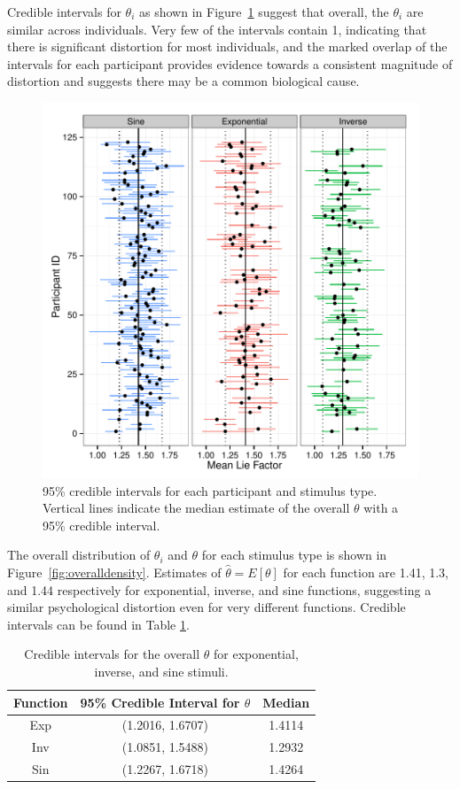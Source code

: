 \documentclass[journal]{vgtc}\usepackage{graphicx, color}
\begin{document}
Credible intervals for $\theta_i$ as shown in Figure~\ref{fig:indivCIs} suggest that overall, the $\theta_i$ are similar across individuals. Very few of the intervals contain 1, indicating that there is significant distortion for most individuals, and the marked overlap of the intervals for each participant provides evidence towards a consistent magnitude of distortion and suggests there may be a common biological cause. 

\begin{figure}\centering
\includegraphics[width=\linewidth]{figure/fig-CIindivMean}
\caption{95\% credible intervals for each participant and stimulus type. Vertical lines indicate the median estimate of the overall $\theta$ with a 95\% credible interval.}\label{fig:indivCIs}
\end{figure}

The overall distribution of $\theta_i$ and $\theta$ for each stimulus type is shown in Figure~\ref{fig:overalldensity}. Estimates of $\hat\theta = E[\theta]$ for each function are 1.41, 1.3, and 1.44 respectively for exponential, inverse, and sine functions, suggesting a similar psychological distortion even for very different functions. Credible intervals can be found in Table \ref{tab:credibleintervalstable}.

\begin{table}\centering\begin{tabular}{ccc}
Function & 95\% Credible Interval for $\theta$ & Median\\\hline
Exp & (1.2016, 1.6707) & 1.4114\\
Inv & (1.0851, 1.5488) & 1.2932\\
Sin & (1.2267, 1.6718) & 1.4264\\
\hline
\end{tabular}
\caption{Credible intervals for the overall $\theta$ for exponential, inverse, and sine stimuli.}\label{tab:credibleintervalstable}\end{table}
\end{document}
